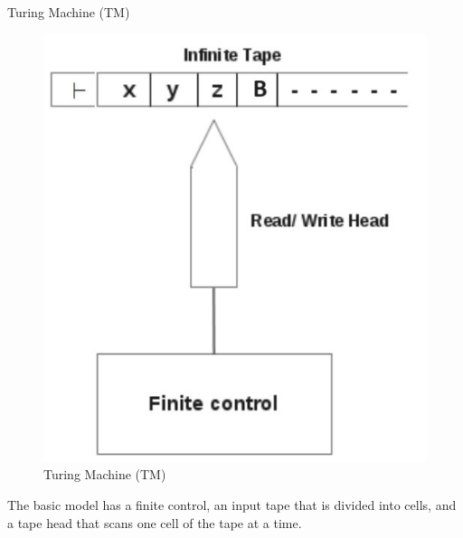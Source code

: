 \documentclass{beamer}
\begin{document}
\begin{frame}{Turing Machine (TM)}
	\begin{figure}
		\includegraphics[scale=.45]{img5/m3}
		\caption{Turing Machine (TM)}
	\end{figure}
The basic model has a finite control, an input tape that is divided into cells, and a tape head that
scans one cell of the tape at a time. 
\end{frame}
\end{document}
